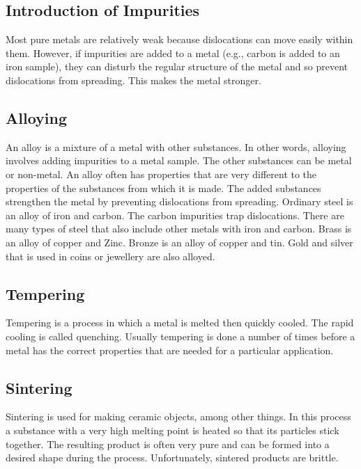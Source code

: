 \subsection*{Introduction of Impurities}
Most pure metals are relatively weak because dislocations can move easily within them. However, if impurities are added to a metal (e.g., carbon is added to an iron sample), they can disturb the regular structure of the metal and so prevent dislocations from spreading. This makes the metal stronger. 
 
\subsection*{Alloying}
An alloy is a mixture of a metal with other substances. In other words, alloying involves adding impurities to a metal sample. The other substances can be metal or non-metal. An alloy often has properties that are very different to the properties of the substances from which it is made. The added substances strengthen the metal by preventing dislocations from spreading. Ordinary steel is an alloy of iron and carbon. The carbon impurities trap dislocations. There are many types of steel that also include other metals with iron and carbon. Brass is an alloy of copper and Zinc. Bronze is an alloy of copper and tin. Gold and silver that is used in coins or jewellery are also alloyed.

\subsection*{Tempering}

Tempering is a process in which a metal is melted then quickly cooled. The rapid cooling is called quenching. Usually tempering is done a number of times before a metal has the correct properties that are needed for a particular application. 

\subsection*{Sintering}

Sintering is used for making ceramic objects, among other things. In
this process a substance with a very high melting point is heated so
that its particles stick together. The resulting product is often very
pure and can be formed into a desired shape during the
process. Unfortunately, sintered products are brittle.

